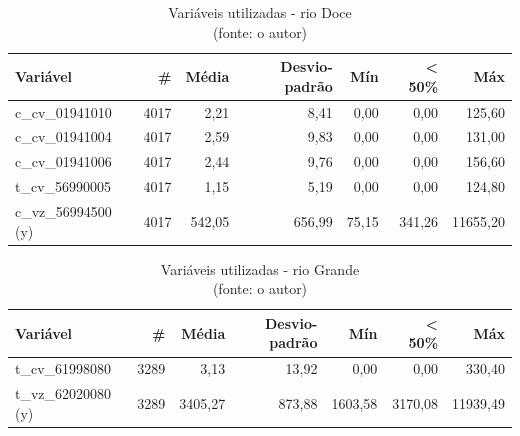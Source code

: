 \begin{table}[!h]
	\centering \small
	\caption{Variáveis utilizadas - rio Doce \\(fonte: o autor)}
	\begin{tabular}{|l|r|r|r|r|r|r|} \hline 
		\textbf{Variável}   & \textbf{\#} & \textbf{Média} & \textbf{Desvio-padrão} & \textbf{Mín} & \textbf{< 50\%} & \textbf{Máx} \\\hline
		c\_cv\_01941010     & 4017        & 2,21           & 8,41                   & 0,00         & 0,00            & 125,60       \\\hline
		c\_cv\_01941004     & 4017        & 2,59           & 9,83                   & 0,00         & 0,00            & 131,00       \\\hline
		c\_cv\_01941006     & 4017        & 2,44           & 9,76                   & 0,00         & 0,00            & 156,60       \\\hline
		t\_cv\_56990005     & 4017        & 1,15           & 5,19                   & 0,00         & 0,00            & 124,80       \\\hline
		c\_vz\_56994500 (y) & 4017        & 542,05         & 656,99                 & 75,15        & 341,26          & 11655,20     \\\hline
	\end{tabular}
	\label{tab:variaveis_rio_doce}
\end{table}

\begin{table}[!h]
	\centering \small
	\caption{Variáveis utilizadas - rio Grande \\(fonte: o autor)}
	\begin{tabular}{|l|r|r|r|r|r|r|} \hline 
		\textbf{Variável}   & \textbf{\#} & \textbf{Média} & \textbf{Desvio-padrão} & \textbf{Mín} & \textbf{< 50\%} & \textbf{Máx} \\\hline
		t\_cv\_61998080     & 3289        & 3,13           & 13,92                  & 0,00         & 0,00            & 330,40       \\\hline
		t\_vz\_62020080 (y) & 3289        & 3405,27        & 873,88                 & 1603,58      & 3170,08         & 11939,49     \\\hline
	\end{tabular}
	\label{tab:variaveis_rio_grande}
\end{table}

